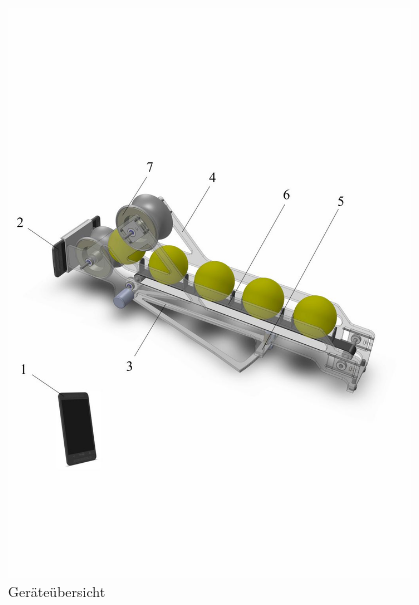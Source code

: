 \begin{figure}[h!]
		\centering
		\includegraphics[width=0.95\textwidth,clip,trim=0mm 18mm 0mm 24mm]
		{Enddokumentation/Loesungskonzept/Bilder/Beschreibung_Komponenten-edited.jpg}
		\caption{Geräteübersicht}
		\label{fig:Geraeteuebersicht}
\end{figure}
\newpage
